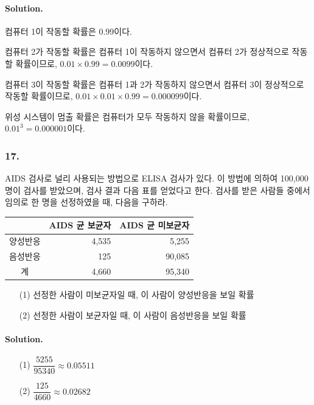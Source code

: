 \paragraph{Solution.} 컴퓨터 1이 작동할 확률은 0.99이다.

컴퓨터 2가 작동할 확률은 컴퓨터 1이 작동하지 않으면서 컴퓨터 2가 정상적으로 작동할 확률이므로, $0.01 \times 0.99 = 0.0099$이다.

컴퓨터 3이 작동할 확률은 컴퓨터 1과 2가 작동하지 않으면서 컴퓨터 3이 정상적으로 작동할 확률이므로, $0.01 \times 0.01 \times 0.99 = 0.000099$이다.

위성 시스템이 멈출 확률은 컴퓨터가 모두 작동하지 않을 확률이므로, ${0.01}^3 = 0.000001$이다.

\subsubsection{17.} AIDS 검사로 널리 사용되는 방법으로 ELISA 검사가 있다. 이 방법에 의하여 100,000명이 검사를 받았으며, 검사 결과 다음 표를 얻었다고 한다. 검사를 받은 사람들 중에서 임의로 한 명을 선정하였을 때, 다음을 구하라.

\begin{center}
	\begin{tabular}{c|r|r}
			 \hline
			 & AIDS 균 보균자 & AIDS 균 미보균자 \\
			 \hline
			 양성반응 & 4,535 & 5,255 \\
			 음성반응 & 125 & 90,085 \\
			 \hline
			 계 & 4,660 & 95,340 \\
			 \hline
	\end{tabular}
\end{center}

\begin{itemize}
	\item[(1)] 선정한 사람이 미보균자일 때, 이 사람이 양성반응을 보일 확률
	\item[(2)] 선정한 사람이 보균자일 때, 이 사람이 음성반응을 보일 확률
\end{itemize}

\paragraph{Solution.}
\begin{itemize}
	\item[(1)] $\dfrac{5255}{95340} \approx 0.05511$
	\item[(2)] $\dfrac{125}{4660} \approx 0.02682$
\end{itemize}

